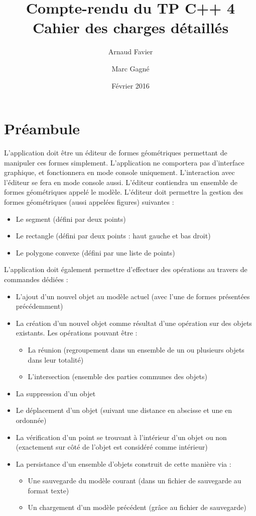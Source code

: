 \documentclass[11pt,a4paper]{article}
\begin{document}
	
	\title{
		Compte-rendu du TP C++ 4\\
		Cahier des charges détaillés
	}
	\author{
		Arnaud Favier\\
		\and
		Marc Gagné
	}
	\date{Février 2016}
	\maketitle
	
	\section*{Préambule}
	
	L’application doit être un éditeur de formes géométriques permettant de manipuler ces formes simplement. L’application ne comportera pas d’interface graphique, et fonctionnera en mode console uniquement. L'interaction avec l'éditeur se fera en mode console aussi. L’éditeur contiendra un ensemble de formes géométriques appelé le modèle. L'éditeur doit permettre la gestion des formes géométriques (aussi appelées figures) suivantes :
	\begin{itemize}
		\item Le segment (défini par deux points)
		\item Le rectangle (défini par deux points : haut gauche et bas droit)
		\item Le polygone convexe (défini par une liste de points)
	\end{itemize}
	
	L’application doit également permettre d'effectuer des opérations au travers de commandes dédiées :
	\begin{itemize}
		\item L'ajout d'un nouvel objet au modèle actuel (avec l'une de formes présentées précédemment)
		\item La création d'un nouvel objet comme résultat d'une opération sur des objets existants. Les opérations pouvant être :
		\begin{itemize}
			\item La réunion (regroupement dans un ensemble de un ou plusieurs objets dans leur totalité)
			\item L’intersection (ensemble des parties communes des objets)
		\end{itemize}
	\item La suppression d'un objet
	\item Le déplacement d'un objet (suivant une distance en abscisse et une en ordonnée)
	\item La vérification d’un point se trouvant à l'intérieur d'un objet ou non (exactement sur côté de l’objet est considéré comme intérieur)
	\item La persistance d'un ensemble d'objets construit de cette manière via :
		\begin{itemize}
			\item Une sauvegarde du modèle courant (dans un fichier de sauvegarde au format texte)
			\item Un chargement d’un modèle précédent (grâce au fichier de sauvegarde)
		\end{itemize}
	\end{itemize}
	
\end{document}
